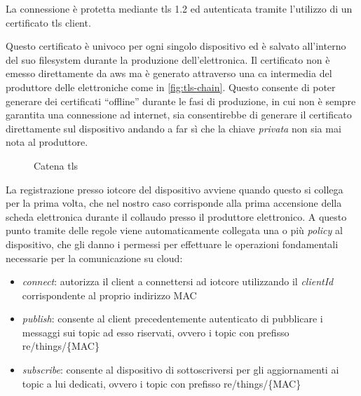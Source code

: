 \documentclass[12pt,a4paper,twoside,titlepage]{book}
\begin{document}
La connessione è protetta mediante \acrshort{tls} 1.2 ed autenticata tramite l'utilizzo di un certificato \acrshort{tls} client.

Questo certificato è univoco per ogni singolo dispositivo ed è salvato all'interno del suo filesystem
durante la produzione dell'elettronica. Il certificato non è emesso direttamente da \acrshort{aws} ma 
è generato attraverso una \acrfull{ca} intermedia del produttore delle elettroniche come in \autoref{fig:tls-chain}. 
Questo consente di poter generare dei certificati ``offline'' durante le fasi di produzione, in cui non 
è sempre garantita una connessione ad internet, sia consentirebbe di generare il certificato direttamente 
sul dispositivo andando a far sì che la chiave \textit{privata} non sia mai nota al produttore. 

\begin{figure}[ht]
    \centering
    \caption{Catena \gls{tls}}
    \label{fig:tls-chain}
\end{figure}

La registrazione presso \Gls{iotcore} del dispositivo avviene quando questo si collega per la prima 
volta, che nel nostro caso corrisponde alla prima accensione della scheda elettronica durante il collaudo 
presso il produttore elettronico. A questo punto tramite delle regole viene automaticamente collegata 
una o più \textit{policy} al dispositivo, che gli danno i permessi per effettuare le operazioni fondamentali 
necessarie per la comunicazione su \gls{cloud}:

\begin{itemize}
    \item \textit{connect}: autorizza il client a connettersi ad \Gls{iotcore} utilizzando il \textit{clientId}
        corrispondente al proprio indirizzo MAC
    \item \textit{publish}: consente al client precedentemente autenticato di pubblicare i messaggi sui topic ad 
        esso riservati, ovvero i \gls{topic} con prefisso \textrm{re/things/\{MAC\}}
    \item \textit{subscribe}: consente al dispositivo di sottoscriversi per gli aggiornamenti ai topic a lui dedicati, 
        ovvero i \gls{topic} con prefisso \textrm{re/things/\{MAC\}}
\end{itemize}
\end{document}
